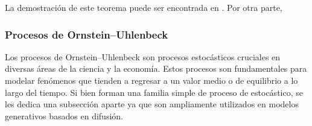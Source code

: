 La demostración de este teorema puede ser encontrada en \cite{anderson1982reverse}. Por otra parte, 








\subsubsection{Procesos de Ornstein–Uhlenbeck}

Los procesos de Ornstein–Uhlenbeck son procesos estocásticos cruciales en diversas áreas de la ciencia y la economía. Estos procesos son fundamentales para modelar fenómenos que tienden a regresar a un valor medio o de equilibrio a lo largo del tiempo. Si bien forman una familia simple de proceso de estocástico, se les dedica una subsección aparte ya que son ampliamente utilizados en modelos generativos basados en difusión.

